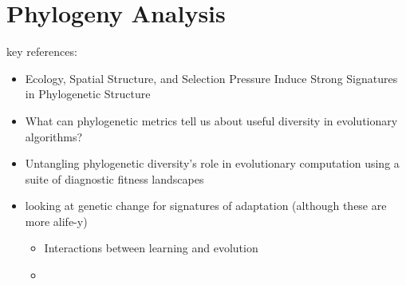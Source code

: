 \section{Phylogeny Analysis}
\label{sec:phylogeny-analysis}

key references:
\begin{itemize}
  \item Ecology, Spatial Structure, and Selection Pressure Induce Strong Signatures in Phylogenetic Structure \citep{moreno2024ecology}
  \item What can phylogenetic metrics tell us about useful diversity in evolutionary algorithms? \citep{hernandez2022can}
  \item Untangling phylogenetic diversity's role in evolutionary computation using a suite of diagnostic fitness landscapes \citep{shahbandegan2022untangling}
  \item looking at genetic change for signatures of adaptation (although these are more alife-y)
  \begin{itemize}
    \item Interactions between learning and evolution \citep{ackley1991interactions}
    \item
  \end{itemize}
\end{itemize}
